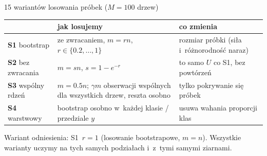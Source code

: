 \documentclass[aspectratio=169,11pt]{beamer}
\begin{document}
\begin{frame}{15 wariantów losowania próbek ($M = 100$ drzew)}
\small
\begin{tabularx}{\textwidth}{lXX}
\toprule
& \textbf{jak losujemy} & \textbf{co zmienia} \\
\midrule
\textbf{S1} bootstrap & ze zwracaniem, $m = rn$, $r \in \{0.2,\dots,1\}$ & rozmiar próbki (siła i~różnorodność naraz) \\
\textbf{S2} bez zwracania & $m = sn$, $s = 1-e^{-r}$ & to samo $U$ co S1, bez powtórzeń \\
\textbf{S3} wspólny rdzeń & $m = 0.5n$; $\gamma m$ obserwacji \alert{wspólnych dla wszystkich} drzew, reszta osobno & \alert{tylko pokrywanie się} próbek \\
\textbf{S4} warstwowy & bootstrap osobno w~każdej klasie / przedziale $y$ & usuwa wahania proporcji klas \\
\bottomrule
\end{tabularx}

\vspace{0.6em}
Wariant odniesienia: S1~$r = 1$ (losowanie bootstrapowe, $m = n$). Wszystkie warianty uczymy na tych samych podziałach i~z~tymi samymi ziarnami.
\end{frame}
\end{document}

